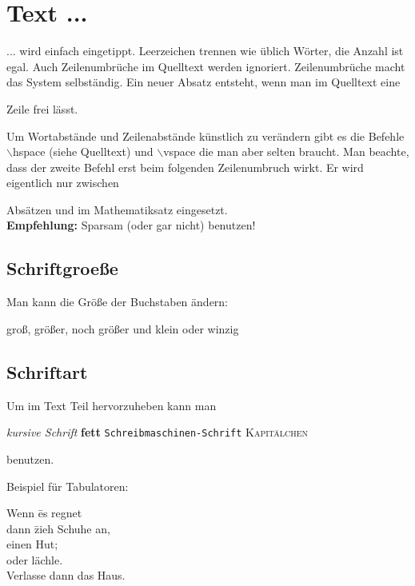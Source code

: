 \section{Text ...}

... wird einfach eingetippt. Leerzeichen trennen wie üblich Wörter, die Anzahl ist egal.
Auch Zeilenumbrüche im Quelltext werden ignoriert.
Zeilenumbrüche macht das System
selbständig. Ein neuer Absatz entsteht, wenn man im Quelltext eine

Zeile frei lässt.  



Um Wortabstände und Zeilenabstände künstlich zu verändern gibt es die Befehle
$\backslash$hspace \hspace{9mm} (siehe Quelltext) und $\backslash$vspace \vspace{10mm}
die man aber selten braucht. Man beachte, dass der zweite Befehl erst beim folgenden Zeilenumbruch wirkt. Er wird eigentlich nur zwischen

\vspace{10mm}
Absätzen und im Mathematiksatz eingesetzt.\\  %
\textbf{Empfehlung:} Sparsam (oder gar nicht) benutzen!

\subsection{Schriftgroeße}


Man kann die Größe der Buchstaben ändern:

{\large groß}, {\LARGE größer}, {\huge noch größer} und {\small klein}
oder {\tiny winzig} 

\subsection{Schriftart}


Um im Text Teil hervorzuheben kann man 

\textit{kursive Schrift}
\quad %
\textbf{fett}
\quad
\texttt{Schreibmaschinen-Schrift} 
\quad
\textsc{Kapitälchen}

benutzen.

Beispiel für Tabulatoren:

\begin{tabbing}
Wenn \= es regnet \\
\> dann \= zieh Schuhe an,\\
\> \> einen Hut;\\
\> oder lächle. \\
Verlasse dann das Haus.
\end{tabbing}

